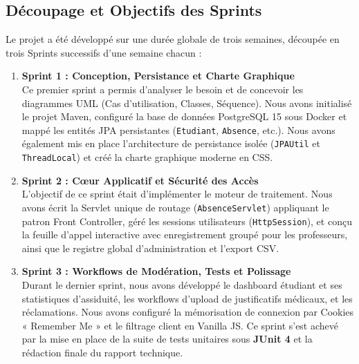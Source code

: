 \documentclass[12pt,a4paper]{article}
\begin{document}
\subsection{Découpage et Objectifs des Sprints}
Le projet a été développé sur une durée globale de trois semaines, découpée en trois Sprints successifs d'une semaine chacun :
\begin{enumerate}
    \item \textbf{Sprint 1 : Conception, Persistance et Charte Graphique} \\
    Ce premier sprint a permis d'analyser le besoin et de concevoir les diagrammes UML (Cas d'utilisation, Classes, Séquence). Nous avons initialisé le projet Maven, configuré la base de données PostgreSQL 15 sous Docker et mappé les entités JPA persistantes (\texttt{Etudiant}, \texttt{Absence}, etc.). Nous avons également mis en place l'architecture de persistance isolée (\texttt{JPAUtil} et \texttt{ThreadLocal}) et créé la charte graphique moderne en CSS.
    \item \textbf{Sprint 2 : Cœur Applicatif et Sécurité des Accès} \\
    L'objectif de ce sprint était d'implémenter le moteur de traitement. Nous avons écrit la Servlet unique de routage (\texttt{AbsenceServlet}) appliquant le patron Front Controller, géré les sessions utilisateurs (\texttt{HttpSession}), et conçu la feuille d'appel interactive avec enregistrement groupé pour les professeurs, ainsi que le registre global d'administration et l'export CSV.
    \item \textbf{Sprint 3 : Workflows de Modération, Tests et Polissage} \\
    Durant le dernier sprint, nous avons développé le dashboard étudiant et ses statistiques d'assiduité, les workflows d'upload de justificatifs médicaux, et les réclamations. Nous avons configuré la mémorisation de connexion par Cookies « Remember Me » et le filtrage client en Vanilla JS. Ce sprint s'est achevé par la mise en place de la suite de tests unitaires sous \textbf{JUnit 4} et la rédaction finale du rapport technique.
\end{enumerate}
\end{document}
